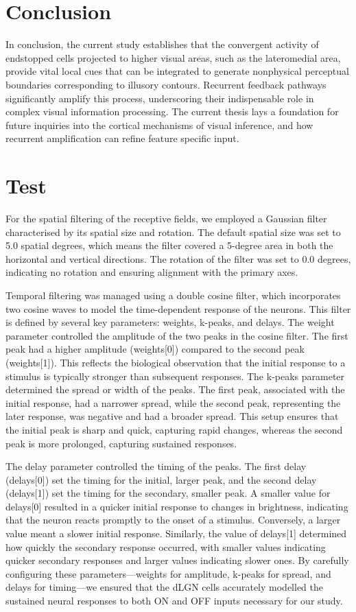 \documentclass[12pt]{article}
\begin{document}
\section*{Conclusion}
In conclusion, the current study establishes that the convergent activity of endstopped cells projected to higher visual areas, such as the lateromedial area, provide vital  local cues that can be integrated to generate nonphysical perceptual boundaries corresponding to illusory contours. Recurrent feedback pathways significantly amplify this process, underscoring their indispensable role in complex visual information processing. The current thesis lays a foundation for future inquiries into the cortical mechanisms of visual inference, and how recurrent amplification can refine feature specific input. 

\section{Test}
For the spatial filtering of the receptive fields, we employed a Gaussian filter characterised by its spatial size and rotation. The default spatial size was set to 5.0 spatial degrees, which means the filter covered a 5-degree area in both the horizontal and vertical directions. The rotation of the filter was set to 0.0 degrees, indicating no rotation and ensuring alignment with the primary axes.

Temporal filtering was managed using a double cosine filter, which incorporates two cosine waves to model the time-dependent response of the neurons. This filter is defined by several key parameters: weights, k-peaks, and delays. The weight parameter controlled the amplitude of the two peaks in the cosine filter. The first peak had a higher amplitude (weights[0]) compared to the second peak (weights[1]). This reflects the biological observation that the initial response to a stimulus is typically stronger than subsequent responses. The k-peaks parameter determined the spread or width of the peaks. The first peak, associated with the initial response, had a narrower spread, while the second peak, representing the later response, was negative and had a broader spread. This setup ensures that the initial peak is sharp and quick, capturing rapid changes, whereas the second peak is more prolonged, capturing sustained responses.

The delay parameter controlled the timing of the peaks. The first delay (delays[0]) set the timing for the initial, larger peak, and the second delay (delays[1]) set the timing for the secondary, smaller peak. A smaller value for delays[0] resulted in a quicker initial response to changes in brightness, indicating that the neuron reacts promptly to the onset of a stimulus. Conversely, a larger value meant a slower initial response. Similarly, the value of delays[1] determined how quickly the secondary response occurred, with smaller values indicating quicker secondary responses and larger values indicating slower ones. By carefully configuring these parameters—weights for amplitude, k-peaks for spread, and delays for timing—we ensured that the dLGN cells accurately modelled the sustained neural responses to both ON and OFF inputs necessary for our study.
\end{document}
